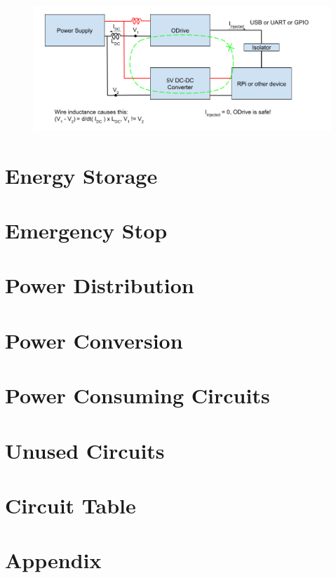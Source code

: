 \begin{figure}[h]
\includegraphics[width=\textwidth]{contents/figures/ground_loop_fix.png}
\end{figure}

\section{Energy Storage}

\section{Emergency Stop}

\section{Power Distribution}

\section{Power Conversion}

\section{Power Consuming Circuits}

\section{Unused Circuits}

\section{Circuit Table}

\section{Appendix}

